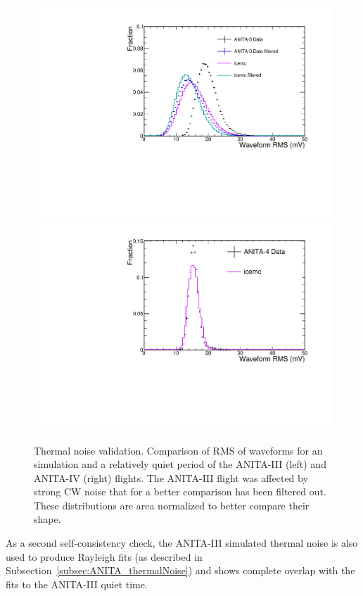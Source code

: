\begin{figure}[!h]\centering
  \includegraphics[width=.45\linewidth]{./Figs/ValidationThermalNoiseA3_RMSwaveform.pdf}
  \includegraphics[width=.45\linewidth]{./Figs/ValidationThermalNoiseA4_RMSwaveform.pdf}

\caption{Thermal noise validation. Comparison of RMS of waveforms for an \icemc simulation and a relatively quiet period of the ANITA-III (left) and ANITA-IV (right) flights.
    The ANITA-III flight was affected by strong CW noise that for a better comparison has been filtered out.
    These distributions are area normalized to better compare their shape.
  }
  \label{fig:RMSwaveform}
\end{figure}

As a second self-consistency check, the ANITA-III simulated thermal
noise is also used to produce Rayleigh fits (as described in
Subsection~\ref{subsec:ANITA_thermalNoise}) and shows complete overlap with the fits to the
ANITA-III quiet time.



